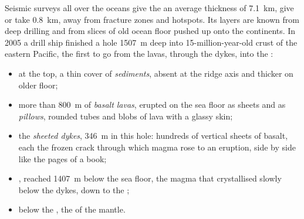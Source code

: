 Seismic surveys all over the oceans give the  an average
thickness of \qty{7.1}{km}, give or take \qty{0.8}{km}, away from fracture
zones and hotspots. Its layers are known from deep drilling and from slices
of old ocean floor pushed up onto the continents. In 2005 a drill ship
finished a hole \qty{1507}{m} deep into 15-million-year-old crust of the
eastern Pacific, the first to go from the lavas, through the dykes, into the
:

\begin{itemize}
  \item at the top, a thin cover of \emph{sediments}, absent at the ridge
        axis and thicker on older floor;
  \item more than \qty{800}{m} of \emph{basalt lavas}, erupted on the sea
        floor as sheets and as \emph{pillows}, rounded tubes and blobs of
        lava with a glassy skin;
  \item the \emph{sheeted dykes}, \qty{346}{m} in this hole: hundreds of
        vertical sheets of basalt, each the frozen crack through which magma
        rose to an eruption, side by side like the pages of a book;
  \item \emph{}, reached \qty{1407}{m} below the sea floor, the magma
        that crystallised slowly below the dykes, down to the ;
  \item below the , the \emph{} of the mantle.
\end{itemize}

